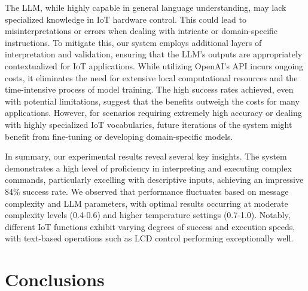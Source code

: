 \documentclass{ieeeaccess}
\begin{document}
The LLM, while highly capable in general language understanding, may lack specialized knowledge in IoT hardware control. This could lead to misinterpretations or errors when dealing with intricate or domain-specific instructions. To mitigate this, our system employs additional layers of interpretation and validation, ensuring that the LLM's outputs are appropriately contextualized for IoT applications. While utilizing OpenAI's API incurs ongoing costs, it eliminates the need for extensive local computational resources and the time-intensive process of model training. The high success rates achieved, even with potential limitations, suggest that the benefits outweigh the costs for many applications. However, for scenarios requiring extremely high accuracy or dealing with highly specialized IoT vocabularies, future iterations of the system might benefit from fine-tuning or developing domain-specific models.

In summary, our experimental results reveal several key insights. The system demonstrates a high level of proficiency in interpreting and executing complex commands, particularly excelling with descriptive inputs, achieving an impressive 84\% success rate. We observed that performance fluctuates based on message complexity and LLM parameters, with optimal results occurring at moderate complexity levels (0.4-0.6) and higher temperature settings (0.7-1.0). Notably, different IoT functions exhibit varying degrees of success and execution speeds, with text-based operations such as LCD control performing exceptionally well. 






\section{Conclusions}\label{sec:conclusion}
\end{document}
